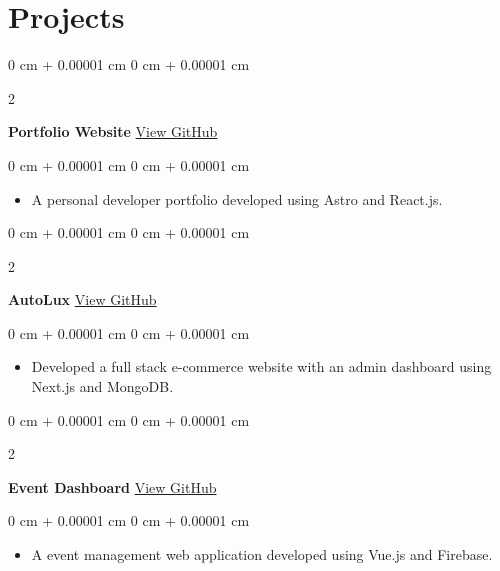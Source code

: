 \documentclass[10pt, letterpaper]{article}
\newenvironment{highlights}{
    \begin{itemize}[
        topsep=0.10 cm,
        parsep=0.10 cm,
        partopsep=0pt,
        itemsep=0pt,
        leftmargin=0 cm + 10pt
    ]
}{
    \end{itemize}
} %
\newenvironment{onecolentry}{
    \begin{adjustwidth}{
        0 cm + 0.00001 cm
    }{
        0 cm + 0.00001 cm
    }
}{
    \end{adjustwidth}
} %
\newenvironment{twocolentry}[2][]{
    \onecolentry
    \def\secondColumn{#2}
    \setcolumnwidth{\fill, 4.5 cm}
    \begin{paracol}{2}
}{
    \switchcolumn \raggedleft \secondColumn
    \end{paracol}
    \endonecolentry
} %
\begin{document}
    
    \section{Projects}

        \begin{twocolentry}{
            \href{https://github.com/alvin-dennis/Personal-Portfolio-2.0}{View GitHub}
        }
            \textbf{Portfolio Website}\end{twocolentry}

        \vspace{0.10 cm}
        \begin{onecolentry}
            \begin{highlights}
                \item A personal developer portfolio developed using Astro and React.js.
            \end{highlights}
        \end{onecolentry}


        \vspace{0.2 cm}

        \begin{twocolentry}{
            \href{https://github.com/alvin-dennis/AutoLux}{View GitHub}
        }
            \textbf{AutoLux}\end{twocolentry}

        \vspace{0.10 cm}
        \begin{onecolentry}
            \begin{highlights}
                \item Developed a full stack e-commerce website with an admin dashboard using Next.js and MongoDB.
            \end{highlights}
        \end{onecolentry}


        \vspace{0.2 cm}

        \begin{twocolentry}{
            \href{https://github.com/alvin-dennis/Sjcet-Events}{View GitHub}
        }
            \textbf{Event Dashboard}\end{twocolentry}

        \vspace{0.10 cm}
        \begin{onecolentry}
            \begin{highlights}
                \item A event management web application developed using Vue.js and Firebase.
            \end{highlights}
        \end{onecolentry}
\end{document}
